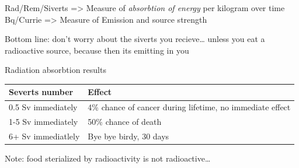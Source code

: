\documentclass[letterpaper]{article}
\begin{document}
Rad/Rem/Siverts => Measure of \emph{absorbtion of energy} per kilogram over
time Bq/Currie => Measure of Emission and source strength

Bottom line: don't worry about the siverts you recieve\ldots{} unless you eat
a radioactive source, because then its emitting in you

Radiation absorbtion results

\begin{center}
\begin{tabular}{ll}
Severts number & Effect\\
\hline
0.5 Sv immediately & 4\% chance of cancer during lifetime, no immediate effect\\
1-5 Sv immediately & 50\% chance of death\\
6+ Sv immediatlely & Bye bye birdy, 30 days\\
\end{tabular}
\end{center}

Note: food sterialized by radioactivity is not radioactive\ldots{}
\end{document}
